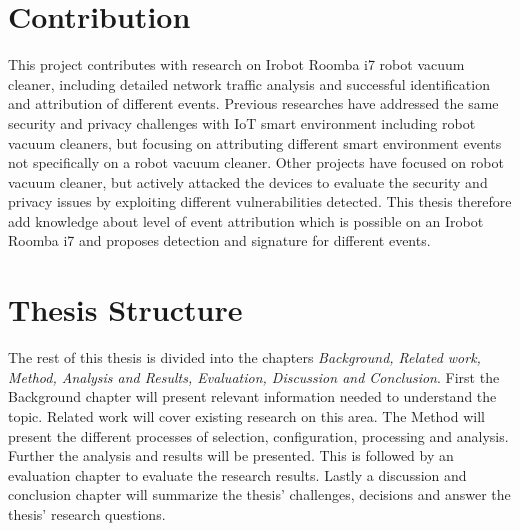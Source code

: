 \section{Contribution}
This project contributes with research on Irobot Roomba i7 robot vacuum cleaner, including detailed network traffic analysis and successful identification and attribution of different events. Previous researches have addressed the same security and privacy challenges with IoT smart environment including robot vacuum cleaners, but focusing on attributing different smart environment events not specifically on a robot vacuum cleaner. Other projects have focused on robot vacuum cleaner, but actively attacked the devices to evaluate the security and privacy issues by exploiting different vulnerabilities detected. This thesis therefore add knowledge about level of event attribution which is possible on an Irobot Roomba i7 and proposes detection and signature for different events. 



\section{Thesis Structure}
The rest of this thesis is divided into the chapters \textit{Background, Related work, Method, Analysis and Results, Evaluation, Discussion and Conclusion}. First the Background chapter will present relevant information needed to understand the topic. Related work will cover existing research on this area. The Method will present the different processes of selection, configuration, processing and analysis. Further the analysis and results will be presented. This is followed by an evaluation chapter to evaluate the research results. Lastly a discussion and conclusion chapter will summarize the thesis' challenges, decisions and answer the thesis' research questions. 



